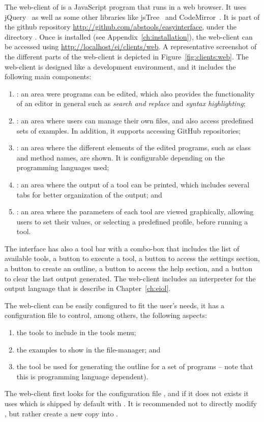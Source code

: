 The web-client of \ei is a JavaScript program that runs in a web
browser. It uses jQuery~\cite{jquery,steyer2013learning} as well as
some other libraries like jsTree~\cite{jstree} and
CodeMirror~\cite{codemirror}. It is part of the github repository
\url{http://github.com/abstools/easyinterface}, under the directory
.
%
Once \ei is installed (see Appendix~\ref{ch:installation}), the
web-client can be accessed using
\url{http://localhost/ei/clients/web}. A representative screenshot of
the different parts of the web-client is depicted in
Figure~\ref{fig:clients:web}.
%
The web-client is designed like a development environment, and it
includes the following main components:
%
\begin{enumerate}
%
\item {}: an area were programs can be edited, which
  also provides the functionality of an editor in general such as
  \emph{search and replace} and \emph{syntax highlighting};
%
\item {}: an area where users can manage their own
  files, and also access predefined sets of examples. In addition, it
  supports accessing GitHub repositories;
%
\item {}: an area where the different elements of the
  edited programs, such as class and method names, are shown. It is
  configurable depending on the programming languages used; 
%
\item {}: an area where the output of a tool can be
  printed, which includes several tabs for better organization of the
  output; and
%
\item {}: an area where the parameters of each tool are
  viewed graphically, allowing users to set their values, or selecting
  a predefined profile, before running a tool.
%
\end{enumerate}
%
The interface has also a tool bar with a combo-box that includes the
list of available tools, a button to execute a tool, a button to
access the settings section, a button to create an outline, a button
to access the help section, and a button to clear the last output
generated.
%
The web-client includes an interpreter for the \ei output language
that is describe in Chapter~\ref{ch:eiol}.

The web-client can be easily configured to fit the user's needs, it
has a configuration file to control, among others, the following
aspects:
%
\begin{enumerate}
\item the tools to include in the tools menu;
\item the examples to show in the file-manager; and
\item the tool be used for generating the outline for a set of
  programs -- note that this is programming language dependent).
\end{enumerate}
%
The web-client first looks for the configuration file
, and if it does not exists it uses
 which is shipped by
default with \ei.
%
It is recommended not to directly modify
, but rather create a new copy
into .

